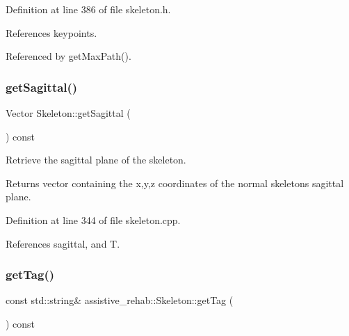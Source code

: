 Definition at line 386 of file skeleton.\+h.


\begin{DoxyCode}{0}

\end{DoxyCode}


References keypoints.



Referenced by get\+Max\+Path().

\mbox{\label{classassistive__rehab_1_1Skeleton_a83133fabc903ddd4e54edf59df977167}} 
\subsubsection{\texorpdfstring{getSagittal()}{getSagittal()}}
{\footnotesize\ttfamily Vector Skeleton\+::get\+Sagittal (\begin{DoxyParamCaption}{ }\end{DoxyParamCaption}) const}



Retrieve the sagittal plane of the skeleton. 

\begin{DoxyReturn}{Returns}
vector containing the x,y,z coordinates of the normal skeleton\textquotesingle{}s sagittal plane. 
\end{DoxyReturn}


Definition at line 344 of file skeleton.\+cpp.


\begin{DoxyCode}{0}

\end{DoxyCode}


References sagittal, and T.

\mbox{\label{classassistive__rehab_1_1Skeleton_a185654045d5e43b3853cdb8fdd676da6}} 
\subsubsection{\texorpdfstring{getTag()}{getTag()}}
{\footnotesize\ttfamily const std\+::string\& assistive\+\_\+rehab\+::\+Skeleton\+::get\+Tag (\begin{DoxyParamCaption}{ }\end{DoxyParamCaption}) const\hspace{0.3cm}{\ttfamily [inline]}}



